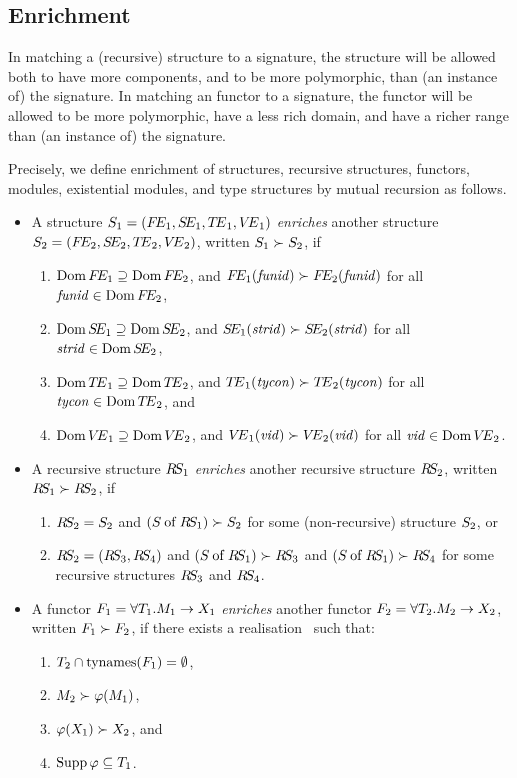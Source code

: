 \subsection{Enrichment}
\label{enrichment-sec}
In matching a (recursive) structure to a signature, the structure will be allowed both to
have more components, and to be more polymorphic, than (an instance of) the
signature.  
In matching an functor to a signature, the functor
will be allowed to be more polymorphic,
have a less rich domain, and have a richer range than (an instance of) the
signature.  

Precisely, we  define enrichment of structures, recursive structures,
functors, modules, existential modules, and type structures by mutual recursion as follows.

\begin{itemize}
\item A structure $\S_1=\longstr[1]$
{\sl enriches} another structure
$\S_2=\longstr[2]$, written $\S_1\succ\S_2$, if
\begin{enumerate}
\item $\Dom\FE_1\supseteq\Dom\FE_2$, and $\FE_1(\funid)\succ\FE_2(\funid)$
                                     for all $\funid\in\Dom\FE_2$,
\item $\Dom\SE_1\supseteq\Dom\SE_2$, and $\SE_1(\strid)\succ\SE_2(\strid)$
                                     for all $\strid\in\Dom\SE_2$,
\item $\Dom\TE_1\supseteq\Dom\TE_2$, and $\TE_1(\tycon)\succ\TE_2(\tycon)$
                                     for all $\tycon\in\Dom\TE_2$, and
\item $\Dom\VE_1\supseteq\Dom\VE_2$, and $\VE_1(\vid)\succ\VE_2(\vid)$
                                     for all $\vid\in\Dom\VE_2$.
\end{enumerate}

\item A recursive structure $\RS_1$
{\sl enriches} another recursive structure
$\RS_2$, written $\RS_1\succ\RS_2$, if
\begin{enumerate}
\item $\RS_2=\S_2$ and $(\of{\S}{\RS_1})\succ\S_2$ for some (non-recursive) structure $\S_2$, or
\item $\RS_2=\longrecstr{3}{4}$ and
 $(\of{\S}{\RS_1})\succ\RS_3$ and $(\of{\S}{\RS_1})\succ\RS_4$ for some recursive structures $\RS_3$ and $\RS_4$.
\end{enumerate}

\item A functor $\F_1=\longfun[1]$
{\sl enriches} another functor
$\F_2=\longfun[2]$, written $\F_1\succ\F_2$, if
there exists a realisation \tyrea\ such that:
\begin{enumerate}
\item $\T_2\cap\TyNamesFcn(\F_1) = \emptyset$,
\item $\M_2 \succ \tyrea(M_1)$,
\item $\tyrea(\XM_1)\succ \XM_2$, and
\item $\Supp \tyrea \subseteq \T_1$.
\end{enumerate}


\end{itemize}

